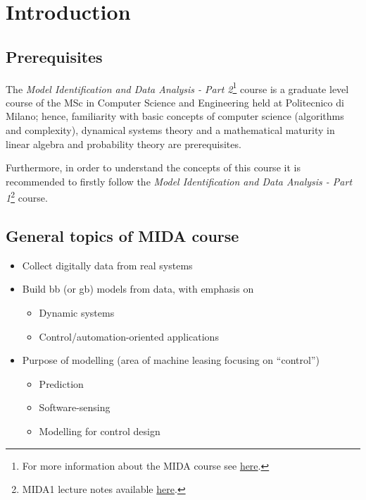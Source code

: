 \setcounter{chapter}{-1}
\chapter{Introduction}

\section{Prerequisites}
The \emph{Model Identification and Data Analysis - Part 2}\footnote{For more information about the MIDA course see \href{https://www4.ceda.polimi.it/manifesti/manifesti/controller/ManifestoPublic.do?EVN_DETTAGLIO_RIGA_MANIFESTO=evento&k_corso_la=481&k_indir=T2A&idItemOfferta=156912&idGruppo=4332&idRiga=271034&codDescr=051587&semestre=2&aa=2021&lang=EN&jaf_currentWFID=main}{here}.} course is a graduate level course of the MSc in Computer Science and Engineering held at Politecnico di Milano; hence, familiarity with basic concepts of computer science (algorithms and complexity), dynamical systems theory and a
mathematical maturity in linear algebra and probability theory are prerequisites. 

Furthermore, in order to understand the concepts of this course it is recommended to firstly follow the \emph{Model Identification and Data Analysis - Part 1}\footnote{MIDA1 lecture notes available \href{https://github.com/teobucci/mida/releases}{here}.} course.

\section{General topics of MIDA course}

\begin{itemize}
    \item Collect digitally data from real systems
    \item Build \acrfull{bb} (or \gls{gb}) models from data, with emphasis on
    \begin{itemize}
        \item Dynamic systems
        \item Control/automation-oriented applications
    \end{itemize}
    \item Purpose of modelling (area of machine leasing focusing on ``control'')
    \begin{itemize}
        \item Prediction
        \item Software-sensing
        \item Modelling for control design
    \end{itemize}
\end{itemize}

